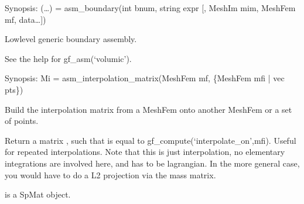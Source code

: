 \documentclass[a4paper,11pt,english]{sphinxmanual}
\begin{document}

\begin{fulllineitems}
\label{\detokenize{python/cmdref_Module asm:getfem.asm_boundary}}
Synopsis: (…) = asm\_boundary(int bnum, string expr {[}, MeshIm mim, MeshFem mf, data…{]})

Low\sphinxhyphen{}level generic boundary assembly.

See the help for gf\_asm(‘volumic’).

\end{fulllineitems}


\begin{fulllineitems}
\label{\detokenize{python/cmdref_Module asm:getfem.asm_interpolation_matrix}}
Synopsis: Mi = asm\_interpolation\_matrix(MeshFem mf, \{MeshFem mfi | vec pts\})

Build the interpolation matrix from a MeshFem onto another MeshFem or a set of points.

Return a matrix , such that  is equal to
gf\_compute(‘interpolate\_on’,mfi). Useful for repeated interpolations.
Note that this is just interpolation, no elementary integrations
are involved here, and  has to be lagrangian. In the more
general case, you would have to do a L2 projection via the mass
matrix.

 is a SpMat object.

\end{fulllineitems}

\end{document}
